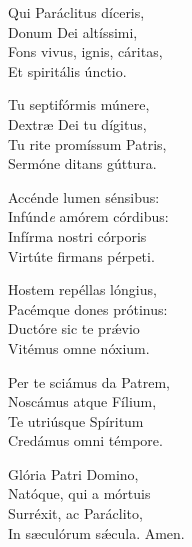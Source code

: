 Qui Paráclitus díceris,\\
Donum Dei altíssimi,\\
Fons vivus, ignis, cáritas,\\
Et spiritális únctio.

Tu septifórmis múnere,\\
Dextræ Dei tu dígitus,\\
Tu rite promíssum Patris,\\
Sermóne ditans gúttura.

Accénde lumen sénsibus:\\
Infúnd\textit{e} amórem córdibus:\\
Infírma nostri córporis\\
Virtúte firmans pérpeti.

Hostem repéllas lóngius,\\
Pacémque dones prótinus:\\
Ductóre sic te prǽvio\\
Vitémus omne nóxium.

Per te sciámus da Patrem,\\
Noscámus atque Fílium,\\
Te utriúsque Spíritum\\
Credámus omni témpore.

Glória Patri Domino,\\
Natóque, qui a mórtuis\\
Surréxit, ac Paráclito,\\
In sæculórum sǽcula.
Amen.